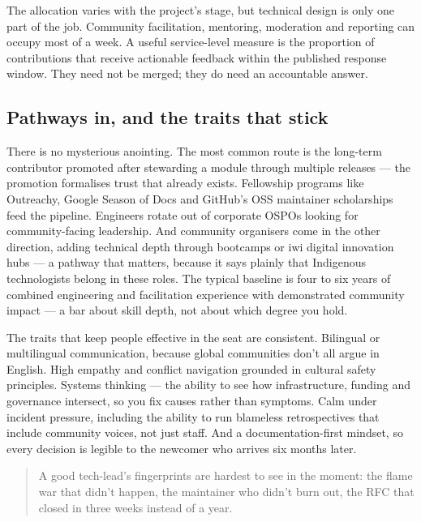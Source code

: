 The allocation varies with the project's stage, but technical design is only one part of the job. Community facilitation, mentoring, moderation and reporting can occupy most of a week. A useful service-level measure is the proportion of contributions that receive actionable feedback within the published response window. They need not be merged; they do need an accountable answer.



\subsection{Pathways in, and the traits that stick}


There is no mysterious anointing. The most common route is the long-term contributor promoted after stewarding a module through multiple releases — the promotion formalises trust that already exists. Fellowship programs like Outreachy, Google Season of Docs and GitHub's OSS maintainer scholarships feed the pipeline. Engineers rotate out of corporate OSPOs looking for community-facing leadership. And community organisers come in the other direction, adding technical depth through bootcamps or iwi digital innovation hubs — a pathway that matters, because it says plainly that Indigenous technologists belong in these roles. The typical baseline is four to six years of combined engineering and facilitation experience with demonstrated community impact — a bar about skill depth, not about which degree you hold.


The traits that keep people effective in the seat are consistent. Bilingual or multilingual communication, because global communities don't all argue in English. High empathy and conflict navigation grounded in cultural safety principles. Systems thinking — the ability to see how infrastructure, funding and governance intersect, so you fix causes rather than symptoms. Calm under incident pressure, including the ability to run blameless retrospectives that include community voices, not just staff. And a documentation-first mindset, so every decision is legible to the newcomer who arrives six months later.



\begin{quote}\small
A good tech-lead's fingerprints are hardest to see in the moment: the flame war that didn't happen, the maintainer who didn't burn out, the RFC that closed in three weeks instead of a year.
\end{quote}



